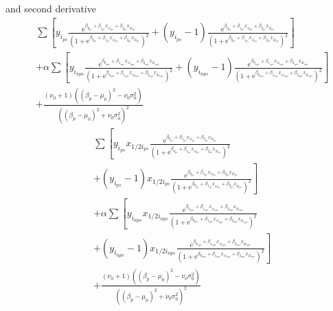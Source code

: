 \documentclass[10.5pt]{article}
\begin{document}
and second derivative
\begin{equation}
    \begin{split}
        &\sum \left[ y_{i_{ps}} \frac{\mathrm{e}^{\beta_{0_{ps}} + \beta_{1_{ps}} x_{1i_{ps}} + \beta_{2_{ps}} x_{2i_{ps}}}}{(1+\mathrm{e}^{\beta_{0_{ps}} + \beta_{1_{ps}} x_{1i_{ps}} + \beta_{2_{ps}} x_{2i_{ps}}})^2} 
        + (y_{i_{ps}} - 1) \frac{\mathrm{e}^{\beta_{0_{ps}} + \beta_{1_{ps}} x_{1i_{ps}} + \beta_{2_{ps}} x_{2i_{ps}}}}{(1+\mathrm{e}^{\beta_{0_{ps}} + \beta_{1_{ps}} x_{1i_{ps}} + \beta_{2_{ps}} x_{2i_{ps}}})^2} \right] \\
        &+ \alpha \sum \left[ y_{i_{nps}} \frac{\mathrm{e}^{\beta_{0_{nps}} + \beta_{1_{nps}} x_{1i_{nps}} + \beta_{2_{nps}} x_{2i_{nps}}}}{(1+\mathrm{e}^{\beta_{0_{nps}} + \beta_{1_{nps}} x_{1i_{nps}} + \beta_{2_{nps}} x_{2i_{nps}}})^2} 
        + (y_{i_{nps}} - 1) \frac{\mathrm{e}^{\beta_{0_{nps}} + \beta_{1_{nps}} x_{1i_{nps}} + \beta_{2_{nps}} x_{2i_{nps}}}}{(1+\mathrm{e}^{\beta_{0_{nps}} + \beta_{1_{nps}} x_{1i_{nps}} + \beta_{2_{nps}} x_{2i_{nps}}})^2} \right] \\
        &+ \frac{(\nu_0 + 1)((\beta_p - \mu_0)^2 - \nu_0 \sigma_0^2)}{\left((\beta_p - \mu_0)^2 + \nu_0 \sigma_0^2\right)^2}
    \end{split}
\end{equation}
\begin{equation}
    \begin{split}
        &\sum \left[ y_{i_{ps}} x_{1/2i_{ps}} 
        \frac{\mathrm{e}^{\beta_{0_{ps}} + \beta_{1_{ps}} x_{1i_{ps}} + \beta_{2_{ps}} x_{2i_{ps}}}}{\left(1+\mathrm{e}^{\beta_{0_{ps}} + \beta_{1_{ps}} x_{1i_{ps}} + \beta_{2_{ps}} x_{2i_{ps}}}\right)^2} \right. \\
        &\left. + (y_{i_{ps}} - 1) x_{1/2i_{ps}} 
        \frac{\mathrm{e}^{\beta_{0_{ps}} + \beta_{1_{ps}} x_{1i_{ps}} + \beta_{2_{ps}} x_{2i_{ps}}}}{\left(1+\mathrm{e}^{\beta_{0_{ps}} + \beta_{1_{ps}} x_{1i_{ps}} + \beta_{2_{ps}} x_{2i_{ps}}}\right)^2} \right] \\
        &+ \alpha \sum \left[ y_{i_{nps}} x_{1/2i_{nps}} 
        \frac{\mathrm{e}^{\beta_{0_{nps}} + \beta_{1_{nps}} x_{1i_{nps}} + \beta_{2_{nps}} x_{2i_{nps}}}}{\left(1+\mathrm{e}^{\beta_{0_{nps}} + \beta_{1_{nps}} x_{1i_{nps}} + \beta_{2_{nps}} x_{2i_{nps}}}\right)^2} \right. \\
        &\left. + (y_{i_{nps}} - 1) x_{1/2i_{nps}} 
        \frac{\mathrm{e}^{\beta_{0_{nps}} + \beta_{1_{nps}} x_{1i_{nps}} + \beta_{2_{nps}} x_{2i_{nps}}}}{\left(1+\mathrm{e}^{\beta_{0_{nps}} + \beta_{1_{nps}} x_{1i_{nps}} + \beta_{2_{nps}} x_{2i_{nps}}}\right)^2} \right] \\
        &+\frac{(\nu_0+1)\left((\beta_p-\mu_0)^2-\nu_0\sigma_0^2\right)}{\left((\beta_p-\mu_0)^2+\nu_0\sigma_0^2\right)^2}
    \end{split}
\end{equation}
\end{document}
